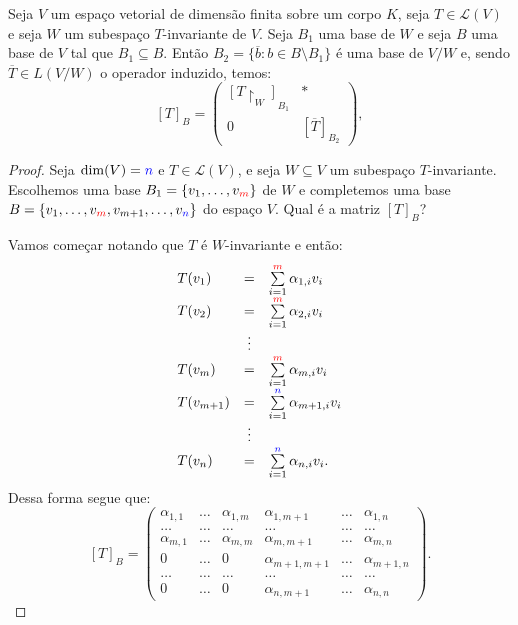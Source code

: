 \documentclass[11pt,twoside,a4paper]{book}
\begin{document}
\begin{proposicao}
Seja \(V\) um espaço vetorial de dimensão finita sobre um corpo \(K\), seja \(T\in\mathcal{L}(V)\)
e seja \(W\) um subespaço \(T\)-invariante de \(V\). Seja $B_1$ uma base de $W$ e seja $B$ uma base de $V$ tal que $B_1\subseteq B$. Então $B_2=\{\overline{b}:b\in B\setminus B_1\}$ é uma base de $V/W$ e, sendo $\overline{T}\in L(V/W)$ o operador induzido, temos:
\[
[T]_B=
\begin{pmatrix}
[T\upharpoonright_W]_{B_1}&*\\0&[\overline{T}]_{B_2}
\end{pmatrix},
\]
\end{proposicao}
\begin{proof}
Seja $\dim(V)=\textcolor{blue}{n}$ e $T\in\mathcal{L}(V)$, e seja $W\subseteq V$ um subespaço
$T$-invariante. Escolhemos uma base $B_1=\{v_1,\dots,v_{\textcolor{red}{m}}\}$ de $W$ e
completemos uma base $B=\{v_1,\dots,v_{\textcolor{red}{m}},v_{m+1},\dots,v_{\textcolor{blue}{n}}\}$ do espaço $V$. Qual é a matriz
$[T]_B$?

\medskip
\noindent
Vamos começar notando que \(T\) é \(W\)-invariante e então:
\[
\begin{array}{lcl}
T(v_1)&=&\sum\limits_{i=1}^{\textcolor{red}{m}}\alpha_{1,i}v_i\\T(v_2)&=&\sum\limits_{i=1}^{\textcolor{red}{m}}\alpha_{2,i}v_i\\&\vdots&\\T(v_m)&=&\sum\limits_{i=1}^{\textcolor{red}{m}}\alpha_{m,i}v_i\\T(v_{m+1})&=&\sum\limits_{i=1}^{\textcolor{blue}{n}}\alpha_{m+1,i}v_i\\&\vdots&\\T(v_n)&=&\sum\limits_{i=1}^{\textcolor{blue}{n}}\alpha_{n,i}v_i.
\end{array}
\]
Dessa forma segue que:
\[[T]_B=\begin{pmatrix}
\alpha_{1,1} & \ldots & \alpha_{1,m} &\alpha_{1,m+1}& \ldots & \alpha_{1,n}
\\\ldots & \ldots & \ldots & \ldots &\ldots & \ldots
\\\alpha_{m,1} & \ldots & \alpha_{m,m} & \alpha_{m,m+1} & \ldots &
\alpha_{m,n}\\ 0 & \ldots & 0 & \alpha_{m+1,m+1}&\ldots &\alpha_{m+1,n}\\
\ldots & \ldots & \ldots & \ldots &\ldots & \ldots \\ 0 & \ldots & 0
&\alpha_{n,m+1} & \ldots & \alpha_{n,n}
\end{pmatrix}.\]


\end{proof}
\end{document}
